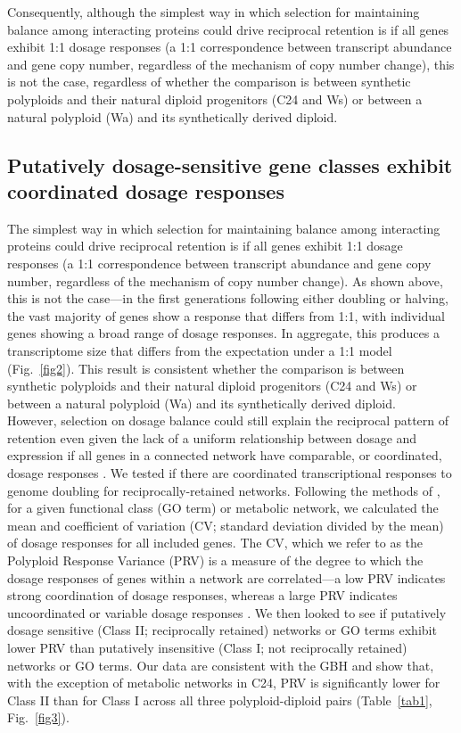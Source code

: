 \documentclass[11pt]{article}
\begin{document}
Consequently, although the simplest way in which selection for maintaining balance among interacting proteins could drive reciprocal retention is if all genes exhibit 1:1 dosage responses (a 1:1 correspondence between transcript abundance and gene copy number, regardless of the mechanism of copy number change), this is not the case, regardless of whether the comparison is between synthetic polyploids and their natural diploid progenitors (C24 and Ws) or between a natural polyploid (Wa) and its synthetically derived diploid.

\subsection*{Putatively dosage-sensitive gene classes exhibit coordinated dosage responses}
The simplest way in which selection for maintaining balance among interacting proteins could drive reciprocal retention is if all genes exhibit 1:1 dosage responses (a 1:1 correspondence between transcript abundance and gene copy number, regardless of the mechanism of copy number change).
As shown above, this is not the case---in the first generations following either doubling or halving, the vast majority of genes show a response that differs from 1:1, with individual genes showing a broad range of dosage responses.
In aggregate, this produces a transcriptome size that differs from the expectation under a 1:1 model (Fig.~\ref{fig2}).
This result is consistent whether the comparison is between synthetic polyploids and their natural diploid progenitors (C24 and Ws)  or between a natural polyploid (Wa) and its synthetically derived diploid.\\

However, selection on dosage balance could still explain the reciprocal pattern of retention even given the lack of a uniform relationship between dosage and expression if all genes in a connected network have comparable, or coordinated, dosage responses \citep{coate2016}.
We tested if there are coordinated transcriptional responses to genome doubling for reciprocally-retained networks.
Following the methods of \cite{coate2016}, for a given functional class (GO term) or metabolic network, we calculated the mean and coefficient of variation (CV; standard deviation divided by the mean) of dosage responses for all included genes.
The CV, which we refer to as the Polyploid Response Variance (PRV) is a measure of the degree to which the dosage responses of genes within a network are correlated---a low PRV indicates strong coordination of dosage responses, whereas a large PRV indicates uncoordinated or variable dosage responses \citep{coate2016}.
We then looked to see if putatively dosage sensitive (Class II; reciprocally retained) networks or GO terms exhibit lower PRV than putatively insensitive (Class I; not reciprocally retained) networks or GO terms.
Our data are consistent with the GBH and show that, with the exception of metabolic networks in C24, PRV is significantly lower for Class II than for Class I across all three polyploid-diploid pairs (Table~\ref{tab1}, Fig.~\ref{fig3}).\\
\end{document}
